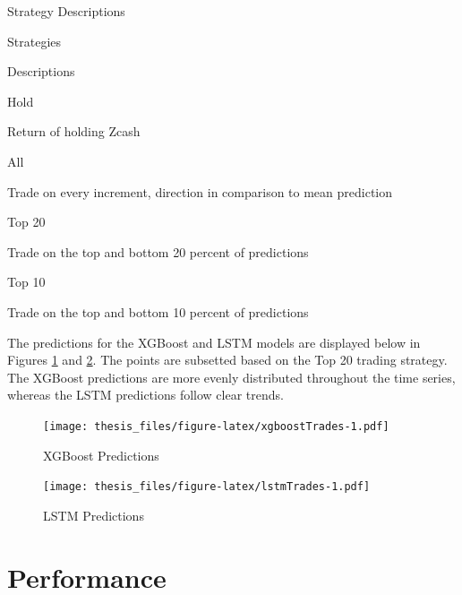 \documentclass[12pt,twoside]{dukestatscithesis}
\begin{document}
\label{tab:strats}Strategy Descriptions

Strategies

Descriptions

Hold

Return of holding Zcash

All

Trade on every increment, direction in comparison to mean prediction

Top 20

Trade on the top and bottom 20 percent of predictions

Top 10

Trade on the top and bottom 10 percent of predictions

The predictions for the XGBoost and LSTM models are displayed below in
Figures \ref{fig:xgboostTrades} and \ref{fig:lstmTrades}. The points are
subsetted based on the Top 20 trading strategy. The XGBoost predictions
are more evenly distributed throughout the time series, whereas the LSTM
predictions follow clear trends.
\begin{figure}
\centering
\texttt{[image: thesis\_files/figure-latex/xgboostTrades-1.pdf]}
\caption{\label{fig:xgboostTrades}XGBoost Predictions}
\end{figure}
\begin{figure}
\centering
\texttt{[image: thesis\_files/figure-latex/lstmTrades-1.pdf]}
\caption{\label{fig:lstmTrades}LSTM Predictions}
\end{figure}
\section{Performance}\label{performance}
\end{document}
